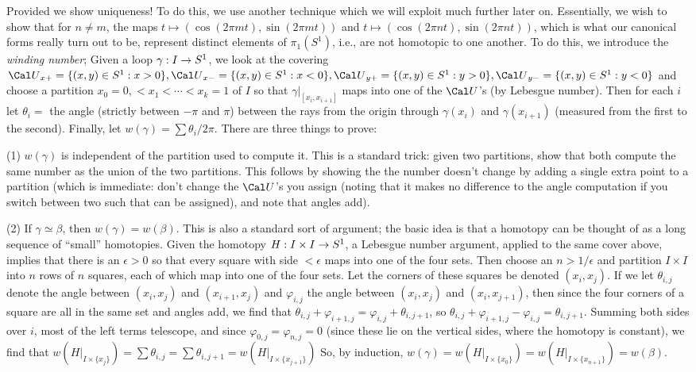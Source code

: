 \ssk

Provided we show uniqueness! To do this, we use another technique which we will exploit 
much further later on. Essentially, we wish to show that for $n\neq m$, the maps
$t\mapsto (\cos(2\pi mt),\sin(2\pi mt))$ and $t\mapsto (\cos(2\pi nt),\sin(2\pi nt))$,
which is what our canonical forms really turn out to be, represent distinct elements of 
$\pi_1(S^1)$, i.e., are not homotopic to one another. To do this, we introduce the {\it 
winding number}; Given a loop $\gamma:I\rightarrow S^1$, we look at the covering 
${\Cal U}_{x+}=\{(x,y)\in S^1 : x>0\},{\Cal U}_{x-}=\{(x,y)\in S^1 : x<0\},
{\Cal U}_{y+}=\{(x,y)\in S^1 : y>0\},{\Cal U}_{y-}=\{(x,y)\in S^1 : y<0\}$
and choose a partition $x_0=0,<x_1<\cdots <x_k=1$ of $I$ so that $\gamma|_{[x_i,x_{i+1}]}$
maps into one of the ${\Cal U}$'s (by Lebesgue number). Then for each $i$ let
$\theta_i=$ the angle (strictly between $-\pi$ and $\pi$) between the rays from the
origin through $\gamma(x_i)$ and $\gamma(x_{i+1})$ (measured from the first to the 
second). Finally, let $w(\gamma)=\sum\theta_i/2\pi$. There are three things to
prove:

\ssk

(1) $w(\gamma)$ is independent of the partition used to compute it. This is a standard
trick: given two partitions, show that both compute the same number as the union of the two
partitions. This follows by showing the the number doesn't change by adding a single
extra point to a partition (which is immediate: don't change the ${\Cal U}$'s you 
assign (noting that it makes no difference to the angle computation if you switch 
between two such that can be assigned), and note that angles add).

\ssk

(2) If $\gamma\simeq \beta$, then $w(\gamma)=w(\beta)$. This is also a standard sort of argument;
the basic idea is that a homotopy can be thought of as a long sequence of ``small'' homotopies.
Given the homotopy $H:I\times I\rightarrow S^1$, a Lebesgue number argument, applied to the same 
cover above, implies that there is an $\epsilon>0$ so that every square with side 
$<\epsilon$ maps into one of the four sets. Then choose an $n>1/\epsilon$ and partition $I\times I$
into $n$ rows of $n$ squares, each of which map into one of the four sets. 
Let the corners of these squares be denoted $(x_i,x_j)$. If we let
$\theta_{i,j}$ denote the angle between $(x_i,x_j)$ and $(x_{i+1},x_j)$ and
$\varphi_{i,j}$ the angle between $(x_i,x_j)$ and $(x_{i},x_{j+1})$, then since the 
four corners of a square are all in the same set and angles add, we find that 
$\theta_{i,j}+\varphi_{i+1,j}=\varphi_{i,j}+\theta_{i,j+1}$, so
$\theta_{i,j}+\varphi_{i+1,j}-\varphi_{i,j}=\theta_{i,j+1}$. Summing both sides over $i$, most
of the left terms telescope, and since $\varphi_{0,j}=\varphi_{n,j}=0$ (since these lie
on the vertical sides, where the homotopy is constant), we find that
$w(H|_{I\times\{x_j\}})=\sum \theta_{i,j} = \sum \theta_{i,j+1} = w(H|_{I\times\{x_{j+1}\}})$
So, by induction, $w(\gamma)=w(H|_{I\times\{x_0\}})=w(H|_{I\times\{x_{n+1}\}})=w(\beta)$.

